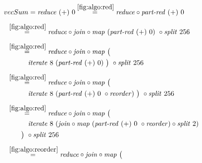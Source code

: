 \begin{figure*}[t]
\begin{align*}
  &\hspace{-1.5em}vecSum = \reduce\ (+)\ 0
%
  \overset{\ref{fig:algo:red}}{=\hspace{.2em}}
      \reduce \circ \partRed\ (+)\ 0\\[.5em]
%
  &\hspace{-2em}\quad\begin{aligned}
    &\overset{\ref{fig:algo:red}}{=\hspace{.2em}}
      \reduce \circ \join \circ \map\ (\partRed\ (+)\ 0)\ \circ \splitN\ 256
  \end{aligned}\\[.5em]
%
  &\hspace{-2em}\quad\begin{aligned}
    &\overset{\ref{fig:algo:red}}{=\hspace{.2em}}
      \reduce \circ \join \circ \map\ \big(\\
    &\qquad\quad\iterateN\ 8\ (\partRed\ (+)\ 0)\ \big)\ \circ \splitN\ 256
  \end{aligned}\\[.5em]
%
  &\hspace{-2em}\quad\begin{aligned}
    &\overset{\ref{fig:algo:red}}{=\hspace{.2em}}
      \reduce \circ \join \circ \map\ \big(\\
    &\qquad\quad\iterateN\ 8\ (\partRed\ (+)\ 0\ \circ \reorder)\ \big)\ \circ \splitN\ 256
  \end{aligned}\\[.5em]
%
  &\hspace{-2em}\quad\begin{aligned}
    &\overset{\ref{fig:algo:red}}{=\hspace{.2em}}
      \reduce \circ \join \circ \map\ \big(\\
    &\qquad\quad\iterateN\ 8\ (\join \circ \map\ (\partRed\ (+)\ 0\ \circ \reorder) \circ \splitN\ 2)\\
    &\qquad\big)\ \circ \splitN\ 256
  \end{aligned}\\[.5em]
%
  &\hspace{-2em}\quad\begin{aligned}
    &\overset{\ref{fig:algo:reorder}}{=\hspace{.2em}}
      \reduce \circ \join \circ \map\ \big(\\

\end{aligned}
\end{align*}
\end{figure*}
